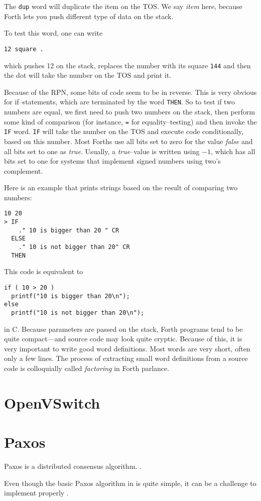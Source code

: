 The \texttt{dup} word will duplicate the item on the \ac{TOS}.  We
say \textit{item} here, because Forth lets you push different type of data
on the stack.

To test this word, one can write 
\begin{verbatim}
12 square .
\end{verbatim}

which pushes 12 on the stack, replaces the number with its square
\texttt{144} and then the dot will take the number on the \ac{TOS}
and print it.

Because of the \ac{RPN}, some bits of code seem to be in reverse.  This is
very obvious for if--statements, which are terminated by the word
\texttt{THEN}.  So to test if two numbers are equal, we first need to push
two numbers on the stack, then perform some kind of comparison (for
instance, \texttt{=} for equality--testing) and then invoke the
\texttt{IF} word.  \texttt{IF} will take the number on the \ac{TOS}
and execute code conditionally, based on this number.  Most Forths use all
bits set to zero for the value \textit{false} and all bits set to one as
\textit{true}.  Usually, a \textit{true}--value is written using $-1$,
which has all bits set to one for systems that implement signed numbers
using two's complement.

Here is an example that prints strings based on the result of comparing two
numbers:

\begin{verbatim}
10 20
> IF
    ." 10 is bigger than 20 " CR
  ELSE
    ." 10 is not bigger than 20" CR
  THEN
\end{verbatim}

This code is equivalent to

\begin{verbatim}
if ( 10 > 20 )
  printf("10 is bigger than 20\n");
else
  printf("10 is not bigger than 20\n");
\end{verbatim}

in C.  Because parameters are passed on the stack, Forth programs tend to be
quite compact---and source code may look quite cryptic.  Because of this, it
is very important to write good word definitions.  Most words are very
short, often only a few lines.  The process of extracting small word
definitions from a source code is colloquially called \textit{factoring} in
Forth parlance.

\section{OpenVSwitch}

\section{Paxos}
Paxos is a distributed consensus algorithm.
.

Even though the basic Paxos algorithm in \cite{Lam01} is quite simple, it can be
a challenge to implement properly \cite{Chandra:2007:PML:1281100.1281103}.


